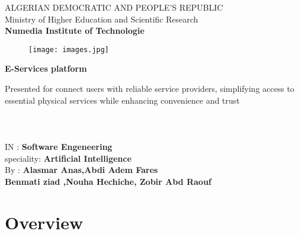 \documentclass[12pt,a4paper]{report}
\begin{document}
\thispagestyle{empty}

\begin{center}
ALGERIAN DEMOCRATIC AND PEOPLE'S REPUBLIC\\ Ministry of Higher Education and Scientific Research\\
\textbf{Numedia Institute of Technologie}\\
\end{center}
\begin{figure}[H]
  \centering
  \texttt{[image: images.jpg]}
\end{figure}
\begin{center}
\begin{LARGE}
\textbf{E-Services platform}\\
\end{LARGE}
     
      
\begin{large}Presented for connect users with reliable service providers, simplifying access to essential physical services while enhancing convenience and trust\\
\textbf{                      }\\
\textbf{                      }\\
\textbf{                      }\\
IN : \textbf{Software Engeneering}\\
speciality: \textbf{Artificial Intelligence}\\
By : \textbf{Alasmar Anas,Abdi Adem Fares }\\
\textbf{Benmati ziad ,Nouha Hechiche, Zobir Abd Raouf}\\


\end{large}
\end{center}
\vfill

\setcounter{page}{0}
\newpage
{}

\newpage
\tableofcontents
\newpage

\chapter{Overview}
\end{document}
